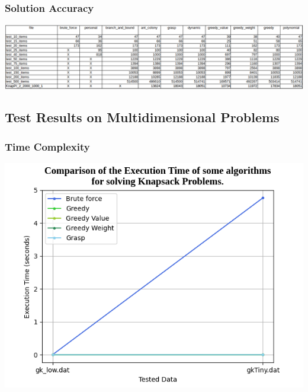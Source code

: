 \documentclass[a4paper, 11pt]{article}
\begin{document}
        \subsubsection{Solution Accuracy}


        \includegraphics[scale = 0.45]{values_0-1.png}

    \subsection{Test Results on Multidimensional Problems}

    \subsubsection{Time Complexity}

    \includegraphics[scale = 0.5]{graph_multi_1.png}
\end{document}
